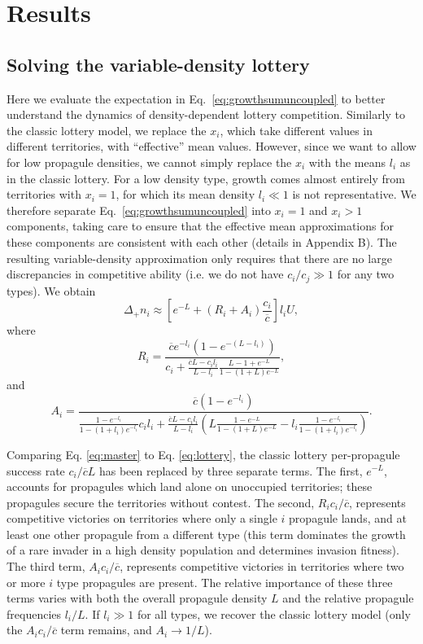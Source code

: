 \documentclass[12pt]{article}
\begin{document}
\section*{Results}

\subsection*{Solving the variable-density lottery}

Here we evaluate the expectation in Eq.~\eqref{eq:growthsumuncoupled} to better understand the dynamics of density-dependent lottery competition. Similarly to the classic lottery model, we replace the $x_i$, which take different values in different territories, with ``effective'' mean values. However, since we want to allow for low propagule densities, we cannot simply replace the $x_i$ with the means $l_i$ as in the classic lottery. For a low density type, growth comes almost entirely from territories with $x_i=1$, for which its mean density $l_i\ll 1$ is not representative. We therefore separate Eq.~\eqref{eq:growthsumuncoupled} into $x_i=1$ and $x_i>1$ components, taking care to ensure that the effective mean approximations for these components are consistent with each other (details in Appendix B). The resulting variable-density approximation only requires that there are no large discrepancies in competitive ability (i.e. we do not have $c_i/c_j\gg 1$ for any two types). We obtain
\begin{equation}
\Delta_+ n_i\approx \left[e^{-L}+(R_i+A_i)\frac{c_i}{\overline{c}}\right]l_i U, \label{eq:master}
\end{equation}
where
\begin{equation}
R_i=\frac{\overline{c}e^{-l_i}(1-e^{-(L-l_i)})}{c_i +\frac{\overline{c}L- c_il_i}{L-l_i}\frac{L-1+e^{-L}}{1-(1+L)e^{-L}}},\nonumber \label{eq:Dr}
\end{equation}
and
\begin{equation}
A_i=\frac{\overline{c}(1-e^{-l_i})}{\frac{1-e^{-l_i}}{1-(1+l_i)e^{-l_i}}c_il_i+\frac{\overline{c}L- c_il_i}{L-l_i}\left(L\frac{1-e^{-L}}{1-(1+L)e^{-L}}-l_i\frac{1-e^{-l_i}}{1-(1+l_i)e^{-l_i}}\right)}. \nonumber \label{eq:Da}
\end{equation}

Comparing Eq. \eqref{eq:master} to Eq. \eqref{eq:lottery}, the classic lottery per-propagule success rate $c_i/\overline{c}L$ has been replaced by three separate terms. The first, $e^{-L}$, accounts for propagules which land alone on unoccupied territories; these propagules secure the territories without contest. The second, $R_i c_i/\overline{c}$, represents competitive victories on territories where only a single $i$ propagule lands, and at least one other propagule from a different type (this term dominates the growth of a rare invader in a high density population and determines invasion fitness). The third term, $A_i c_i/\overline{c}$, represents competitive victories in territories where two or more $i$ type propagules are present. The relative importance of these three terms varies with both the overall propagule density $L$ and the relative propagule frequencies $l_i/L$. If $l_i\gg 1$ for all types, we recover the classic lottery model (only the $A_ic_i/\overline{c}$ term remains, and $A_i\rightarrow 1/L$). 
\end{document}
